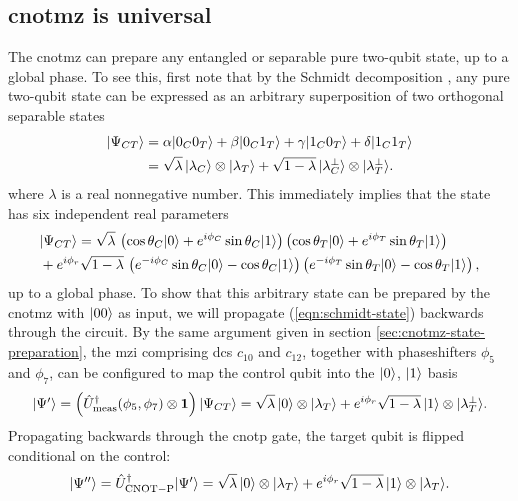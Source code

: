 \subsection{\acrshort{cnotmz} is universal}
\label{sec:arbitrary-two-qubit}
The \gls{cnotmz} can prepare any entangled or separable pure two-qubit state, up to a global phase.
To see this, first note that by the Schmidt decomposition \cite{Nielsen2004}, any pure two-qubit state can be expressed as an arbitrary superposition of two orthogonal separable states
\begin{align}
  \mbox{$ | \Psi_{CT} \rangle $} &= \alpha\mbox{$ | 0_C0_T \rangle $} + \beta \mbox{$ | 0_C1_T \rangle $} +\gamma \mbox{$ | 1_C0_T \rangle $} + \delta\mbox{$ | 1_C1_T \rangle $} \\
  &= \sqrt{\lambda} \, \mbox{$ | \lambda_C \rangle $} \otimes \mbox{$ | \lambda_T  \rangle $}
  + \sqrt{1-\lambda} \, \mbox{$ | \lambda_C ^ \perp \rangle $} \otimes \mbox{$ | \lambda_T ^ \perp \rangle $}.
  \label{eqn:schmidt-state}
\end{align}
where $\lambda$ is a real nonnegative number. 
This immediately implies that the state has six independent real parameters
\begin{align}
   &\mbox{$ | \Psi_{CT} \rangle $}  =  
   \sqrt{\lambda} \, 
   \left( \cos \theta_C \mbox{$ | 0 \rangle $} + e^{i\phi_C} \sin \theta_C \mbox{$ | 1 \rangle $} \right)
   \left( \cos \theta_T \mbox{$ | 0 \rangle $} + e^{i\phi_T} \sin \theta_T \mbox{$ | 1 \rangle $} \right)\\
   &+
   e^{i \phi_r}
   \sqrt{1-\lambda} \, 
   \left( e^{-i\phi_C} \sin \theta_C \mbox{$ | 0 \rangle $} - \cos \theta_C \mbox{$ | 1 \rangle $} \right)
   \left( e^{-i\phi_T} \sin \theta_T \mbox{$ | 0 \rangle $} - \cos \theta_T \mbox{$ | 1 \rangle $} \right),
\end{align}
up to a global phase.
To show that this arbitrary state can be prepared by the \gls{cnotmz} with $\mbox{$ | 00 \rangle $}$ as input, we will propagate (\ref{eqn:schmidt-state}) backwards through the circuit. By the same argument given in section \ref{sec:cnotmz-state-preparation}, the \gls{mzi} comprising \glspl{dc} $c_{10}$  and $c_{12}$, together with phaseshifters $\phi_5$ and $\phi_7$, can be configured to map the control qubit into the $\mbox{$ | 0 \rangle $}$, $\mbox{$ | 1 \rangle $}$ basis 
\begin{equation}
   \mbox{$ | \Psi' \rangle $} = 
   \left( 
   \hat{U}_\mathrm{meas}^\dagger(\phi_5, \phi_7) 
   \otimes 
   \mathbf{1} 
   \right) \mbox{$ | \Psi_{CT} \rangle $}  
    = \sqrt{\lambda} \, \mbox{$ | 0 \rangle $} \otimes \mbox{$ | \lambda_T \rangle $} 
    + e^{i \phi_r}\sqrt{1-\lambda} \, \mbox{$ | 1 \rangle $} \otimes \mbox{$ | \lambda_T^\perp \rangle $}.
\end{equation}
Propagating backwards through the \gls{cnotp} gate, the target qubit is flipped conditional on the control:
\begin{equation}
   \mbox{$ | \Psi'' \rangle $} = \hat{U}_\mathrm{CNOT-P}^\dagger \mbox{$ | \Psi' \rangle $}  
    = \sqrt{\lambda} \, \mbox{$ | 0 \rangle $} \otimes \mbox{$ | \lambda_T \rangle $} 
    + e^{i \phi_r}\sqrt{1-\lambda} \, \mbox{$ | 1 \rangle $} \otimes \mbox{$ | \lambda_T \rangle $}.
\end{equation}
